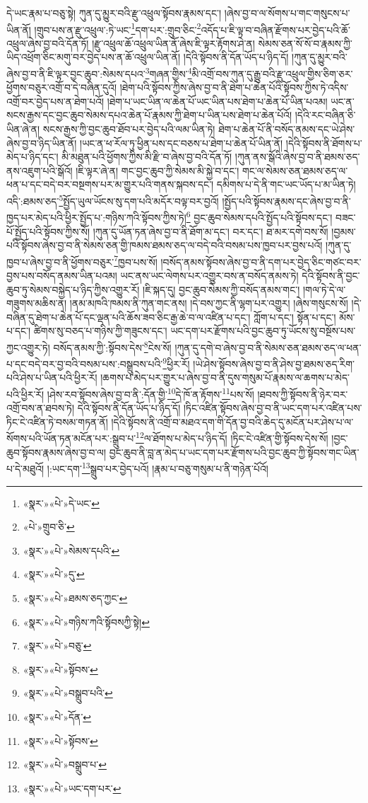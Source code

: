 དེ་ཡང་རྣམ་པ་བཅུ་སྟེ། ཀུན་དུ་མྱུར་བའི་རྫུ་འཕྲུལ་སྟོབས་རྣམས་དང་། །ཞེས་བྱ་བ་ལ་སོགས་པ་གང་གསུངས་པ་ཡིན་ནོ། །གྲུབ་པས་ན་རྫུ་འཕྲུལ་:ཏེ་ཡང་\footnote{«སྣར་»«པེ་»དེ་ཡང་}དག་པར་:གྲུབ་ཅིང་\footnote{«པེ་»གྲུབ་ཅི་}འདོད་པ་ཇི་ལྟ་བ་བཞིན་རྫོགས་པར་བྱེད་པའི་ཆོ་འཕྲུལ་ཞེས་བྱ་བའི་དོན་ཏོ། །རྫུ་འཕྲུལ་ཆོ་འཕྲུལ་ཡིན་ནོ་ཞེས་ཇི་ལྟར་རྟོགས་ཤེ་ན། སེམས་ཅན་སོ་སོ་བ་རྣམས་ཀྱི་ཡིད་འཕྲོག་ཅིང་མགུ་བར་བྱེད་པས་ན་ཆོ་འཕྲུལ་ཡིན་ནོ། །དེའི་སྟོབས་ནི་དོན་ཡོད་པ་ཉིད་དོ། །ཀུན་དུ་མྱུར་བའི་ཞེས་བྱ་བ་ནི་ཇི་ལྟར་བྱང་ཆུབ་:སེམས་དཔའ་\footnote{«སྣར་»«པེ་»སེམས་དཔའི་}གཞན་གྱིས་\footnote{«སྣར་»«པེ་»དུ་}མི་འགྲོ་བས་ཀུན་དུ་རྒྱུ་བའི་རྫུ་འཕྲུལ་གྱིས་ཅིག་ཅར་ཕྱོགས་བཅུར་འགྲོ་བ་དེ་བཞིན་དུའོ། །ཐེག་པའི་སྟོབས་ཀྱིས་ཞེས་བྱ་བ་ནི་ཐེག་པ་ཆེན་པོའི་སྟོབས་ཀྱིས་ཏེ་འདིས་འགྲོ་བར་བྱེད་པས་ན་ཐེག་པའོ། །ཐེག་པ་ཡང་ཡིན་ལ་ཆེན་པོ་ཡང་ཡིན་པས་ཐེག་པ་ཆེན་པོ་ཡིན་པའམ། ཡང་ན་སངས་རྒྱས་དང་བྱང་ཆུབ་སེམས་དཔའ་ཆེན་པོ་རྣམས་ཀྱི་ཐེག་པ་ཡིན་པས་ཐེག་པ་ཆེན་པོའོ། །དེའི་རང་བཞིན་ཅི་ཡིན་ཞེ་ན། སངས་རྒྱས་ཀྱི་བྱང་ཆུབ་ཐོབ་པར་བྱེད་པའི་ལམ་ཡིན་ཏེ། ཐེག་པ་ཆེན་པོ་ནི་བསོད་ནམས་དང་ཡེ་ཤེས་ཞེས་བྱ་བ་ཉིད་ཡིན་ནོ། །ཡང་ན་ཕ་རོལ་ཏུ་ཕྱིན་པས་དང་བཅས་པ་ཐེག་པ་ཆེན་པོ་ཡིན་ནོ། །དེའི་སྟོབས་ནི་ཐོགས་པ་མེད་པ་ཉིད་དང་། མི་མཐུན་པའི་ཕྱོགས་ཀྱིས་མི་རྫི་བ་ཞེས་བྱ་བའི་དོན་ཏོ། །ཀུན་ནས་སྒོའི་ཞེས་བྱ་བ་ནི་ཐམས་ཅད་ནས་འཇུག་པའི་སྒོའོ། །ཇི་ལྟར་ཞེ་ན། གང་བྱང་ཆུབ་ཀྱི་སེམས་མི་སྐྱེ་བ་དང་། གང་ལ་སེམས་ཅན་ཐམས་ཅད་ལ་ཕན་པ་དང་བདེ་བར་བསྔགས་པར་མ་གྱུར་པའི་གནས་སྐབས་དང་། དམིགས་པ་དེ་ནི་གང་ཡང་ཡོད་པ་མ་ཡིན་ཏེ། འདི་:ཐམས་ཅད་\footnote{«སྣར་»«པེ་»ཐམས་ཅད་ཀྱང་}སྤྱོད་ཡུལ་ཡོངས་སུ་དག་པའི་མདོར་བལྟ་བར་བྱའོ། །སྤྱོད་པའི་སྟོབས་རྣམས་དང་ཞེས་བྱ་བ་ནི་ཁྱད་པར་མེད་པའི་ཕྱིར་སྤྱོད་པ་:གཉིས་ཀའི་སྟོབས་ཀྱིས་ཏེ།\footnote{«སྣར་»«པེ་»གཉིས་ཀའི་སྟོབསཀྱི་སྟེ།} བྱང་ཆུབ་སེམས་དཔའི་སྤྱོད་པའི་སྟོབས་དང་། བཟང་པོ་སྤྱོད་པའི་སྟོབས་ཀྱིས་སོ། །ཀུན་དུ་ཡོན་ཏན་ཞེས་བྱ་བ་ནི་ཐོག་མ་དང་། བར་དང་། ཐ་མར་དགེ་བས་སོ། །བྱམས་པའི་སྟོབས་ཞེས་བྱ་བ་ནི་སེམས་ཅན་གྱི་ཁམས་ཐམས་ཅད་ལ་བདེ་བའི་བསམ་པས་ཁྱབ་པར་བྱས་པའོ། །ཀུན་དུ་ཁྱབ་པ་ཞེས་བྱ་བ་ནི་ཕྱོགས་བཅུར་\footnote{«སྣར་»«པེ་»བཅུ་}ཁྱབ་པས་སོ། །བསོད་ནམས་སྟོབས་ཞེས་བྱ་བ་ནི་དག་པར་བྱེད་ཅིང་གཙང་བར་བྱས་པས་བསོད་ནམས་ཡིན་པའམ། ཡང་ནས་ཡང་ལེགས་པར་འགྱུར་བས་ན་བསོད་ནམས་ཏེ། དེའི་སྟོབས་ནི་བྱང་ཆུབ་ཏུ་སེམས་བསྐྱེད་པ་ཉིད་ཀྱིས་འགྱུར་རོ། །ཇི་སྐད་དུ། བྱང་ཆུབ་སེམས་ཀྱི་བསོད་ནམས་གང་། །གལ་ཏེ་དེ་ལ་གཟུགས་མཆིས་ན། །ནམ་མཁའི་ཁམས་ནི་ཀུན་གང་ནས། །དེ་བས་ཀྱང་ནི་ལྷག་པར་འགྱུར། །ཞེས་གསུངས་སོ། །དེ་བཞིན་དུ་ཐེག་པ་ཆེན་པོ་དང་ལྡན་པའི་ཆོས་ཟབ་ཅིང་རྒྱ་ཆེ་བ་ལ་འཛིན་པ་དང་། ཀློག་པ་དང་། སྟོན་པ་དང་། མོས་པ་དང་། ཚིགས་སུ་བཅད་པ་གཉིས་ཀྱི་གཟུངས་དང་། ཡང་དག་པར་རྫོགས་པའི་བྱང་ཆུབ་ཏུ་ཡོངས་སུ་བསྔོས་པས་ཀྱང་འགྱུར་ཏེ། བསོད་ནམས་ཀྱི་:སྟོབས་དེས་\footnote{«སྣར་»«པེ་»སྟོབས་}ངེས་སོ། །ཀུན་དུ་དགེ་བ་ཞེས་བྱ་བ་ནི་སེམས་ཅན་ཐམས་ཅད་ལ་ཕན་པ་དང་བདེ་བར་བྱ་བའི་བསམ་པས་:བསྒྲུབས་པའི་\footnote{«སྣར་»«པེ་»བསྒྲུབ་པའི་}ཕྱིར་རོ། །ཡེ་ཤེས་སྟོབས་ཞེས་བྱ་བ་ནི་ཤེས་བྱ་ཐམས་ཅད་རིག་པའི་ཤེས་པ་ཡིན་པའི་ཕྱིར་རོ། །ཆགས་པ་མེད་པར་གྱུར་པ་ཞེས་བྱ་བ་ནི་དུས་གསུམ་པོ་རྣམས་ལ་ཆགས་པ་མེད་པའི་ཕྱིར་རོ། །ཤེས་རབ་སྟོབས་ཞེས་བྱ་བ་ནི་:དོན་གྱི་\footnote{«སྣར་»«པེ་»དོན་}དེ་ཁོ་ན་རྟོགས་\footnote{«སྣར་»«པེ་»སྟོབས་}པས་སོ། །ཐབས་ཀྱི་སྟོབས་ནི་ཉེར་བར་འགྲོ་བས་ན་ཐབས་ཏེ། དེའི་སྟོབས་ནི་དོན་ཡོད་པ་ཉིད་དོ། །ཏིང་འཛིན་སྟོབས་ཞེས་བྱ་བ་ནི་ཡང་དག་པར་འཛིན་པས་ཏིང་ངེ་འཛིན་ཏེ་བསམ་གཏན་ནོ། །དེའི་སྟོབས་ནི་འགྲོ་བ་མཐའ་དག་གི་དོན་བྱ་བའི་ཆེད་དུ་མངོན་པར་ཤེས་པ་ལ་སོགས་པའི་ཡོན་ཏན་མངོན་པར་:སྒྲུབ་པ་\footnote{«སྣར་»«པེ་»བསྒྲུབ་པ་}ལ་ཐོགས་པ་མེད་པ་ཉིད་དོ། །ཏིང་ངེ་འཛིན་གྱི་སྟོབས་དེས་སོ། །བྱང་ཆུབ་སྟོབས་རྣམས་ཞེས་བྱ་བ་ལ། བྱང་ཆུབ་ནི་བླ་ན་མེད་པ་ཡང་དག་པར་རྫོགས་པའི་བྱང་ཆུབ་ཀྱི་སྟོབས་གང་ཡིན་པ་དེ་མཐུའོ། །:ཡང་དག་\footnote{«སྣར་»«པེ་»ཡང་དག་པར་}སྒྲུབ་པར་བྱེད་པའོ། །རྣམ་པ་བཅུ་གསུམ་པ་ནི་གཉེན་པོའོ། 